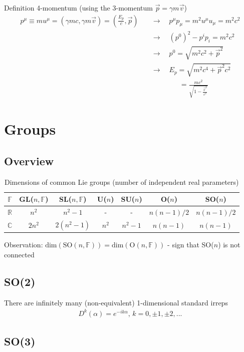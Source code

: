 \documentclass[10pt,a4paper]{article}
\theoremstyle{definition}
\begin{document}
Definition 4-momentum (using the 3-momentum $\vec{p}=\gamma m\vec{v}$)
\begin{align}
    p^\mu \equiv mu^\mu=(\gamma mc,\gamma m\vec{v})=\left(\frac{E_p}{c},\vec{p}\right)\quad&\rightarrow\quad p^\mu p _\mu=m^2u^\mu u_\mu=m^2c^2\\
    &\rightarrow\quad (p^0)^2-p^ip_i=m^2c^2\\
    &\rightarrow\quad p^0=\sqrt{m^2c^2+\vec{p}^2}\\
    &\rightarrow\quad E_p=\sqrt{m^2c^4+\vec{p}^2c^2}\\
    &\qquad\qquad=\frac{mc^2}{\sqrt{1-\frac{\vec{v}^2}{c^2}}}
\end{align}

\section{Groups}
\subsection{Overview}
\begin{table}[!h]
    \centering
    \begin{tabular}{c | c c c c c c}
        $\mathbb{F}$    & GL($n,\mathbb{F}$)    & SL($n,\mathbb{F}$) & U($n$) & SU($n$) & O($n$)     & SO($n$)     \\ \hline\hline
        $\mathbb{R}$    & $n^2$                 & $n^2-1$            & -      & -       & $n(n-1)/2$ & $n(n-1)/2$  \\
        $\mathbb{C}$    & $2n^2$                & $2(n^2-1)$         & $n^2$  & $n^2-1$ & $n(n-1)$   & $n(n-1)$    \\
    \end{tabular}
    \caption{Dimensions of common Lie groups (number of independent real parameters)}
    \label{tab:my_label}
\end{table}
Observation: $\text{dim}(\text{SO}(n,\mathbb{F}))=\text{dim}(\text{O}(n,\mathbb{F}))$  - sign that SO($n$) is not connected

\subsection{SO(2)}
There are infinitely many (non-equivalent) 1-dimensional standard irreps
\begin{align}
    D^{k}(\alpha)=e^{-ik\alpha},\,k=0,\pm1,\pm2,...
\end{align}

\subsection{SO(3)}
\end{document}

